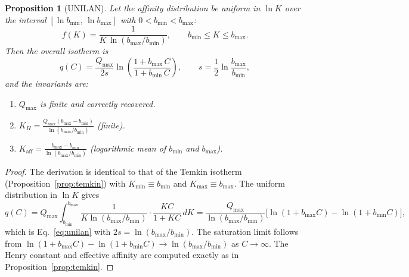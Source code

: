 \documentclass[12pt]{article}
\newtheorem{proposition}{Proposition}
\begin{document}
\begin{proposition}[UNILAN]
\label{prop:unilan}
Let the affinity distribution be uniform in $\ln K$ over the interval
$[\ln b_{\min},\, \ln b_{\max}]$ with $0 < b_{\min} < b_{\max}$:
\begin{equation}
  f(K) = \frac{1}{K\,\ln(b_{\max}/b_{\min})},
  \qquad b_{\min} \le K \le b_{\max}.
  \label{eq:unilan_dist}
\end{equation}
Then the overall isotherm is
\begin{equation}
  q(C) = \frac{Q_{\max}}{2s}
  \ln\!\left(\frac{1 + b_{\max}\,C}{1 + b_{\min}\,C}\right),
  \qquad s = \frac{1}{2}\ln\frac{b_{\max}}{b_{\min}},
  \label{eq:unilan}
\end{equation}
and the invariants are:
\begin{enumerate}[nosep]
  \item $Q_{\max}$ is finite and correctly recovered.
  \item $K_H = \displaystyle
        \frac{Q_{\max}(b_{\max} - b_{\min})}
             {\ln(b_{\max}/b_{\min})}$ (finite).
  \item $K_{\mathrm{aff}} = \displaystyle
        \frac{b_{\max} - b_{\min}}{\ln(b_{\max}/b_{\min})}$
        \quad (logarithmic mean of $b_{\min}$ and $b_{\max}$).
\end{enumerate}
\end{proposition}

\begin{proof}
The derivation is identical to that of the Temkin isotherm
(Proposition~\ref{prop:temkin}) with
$K_{\min} \equiv b_{\min}$ and $K_{\max} \equiv b_{\max}$.
The uniform distribution in $\ln K$ gives
\[
  q(C) = Q_{\max}\int_{b_{\min}}^{b_{\max}}
  \frac{1}{K\ln(b_{\max}/b_{\min})}
  \cdot\frac{KC}{1+KC}\,dK
  = \frac{Q_{\max}}{\ln(b_{\max}/b_{\min})}
  \bigl[\ln(1+b_{\max}C) - \ln(1+b_{\min}C)\bigr],
\]
which is Eq.~\eqref{eq:unilan} with $2s = \ln(b_{\max}/b_{\min})$.
The saturation limit follows from
$\ln(1+b_{\max}C) - \ln(1+b_{\min}C) \to \ln(b_{\max}/b_{\min})$ as
$C\to\infty$.  The Henry constant and effective affinity are computed
exactly as in Proposition~\ref{prop:temkin}.
\end{proof}
\end{document}
